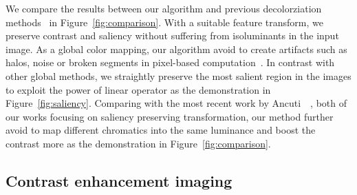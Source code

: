 We compare the results between our algorithm and previous decolorziation
methods~\cite{Ancuti:2011:ESG,Kim:2009:RCV,Smith:2008:AGA,Grundland:2007:DFC,Rasche:2005:DPR,Gooch:2005:CSC} in Figure~\ref{fig:comparison}.
With a suitable feature transform, we preserve contrast and saliency without suffering
from isoluminants in the input image.
As a global color mapping, our algorithm avoid to create artifacts such as halos, noise
or broken segments in pixel-based 
computation~\cite{Bala:2004:SCT,Gooch:2005:CSC,Rasche:2005:RIG}.
In contrast with other global methods, we straightly preserve the most salient region
in the images to exploit the power of linear operator as the demonstration in
Figure~\ref{fig:saliency}.
Comparing with the most recent work by Ancuti~\etal~\cite{Ancuti:2011:ESG},
both of our works focusing on saliency preserving transformation,
our method further avoid to map different chromatics into the same luminance
and boost the contrast more as the demonstration in Figure~\ref{fig:comparison}.

\subsection{Contrast enhancement imaging}

